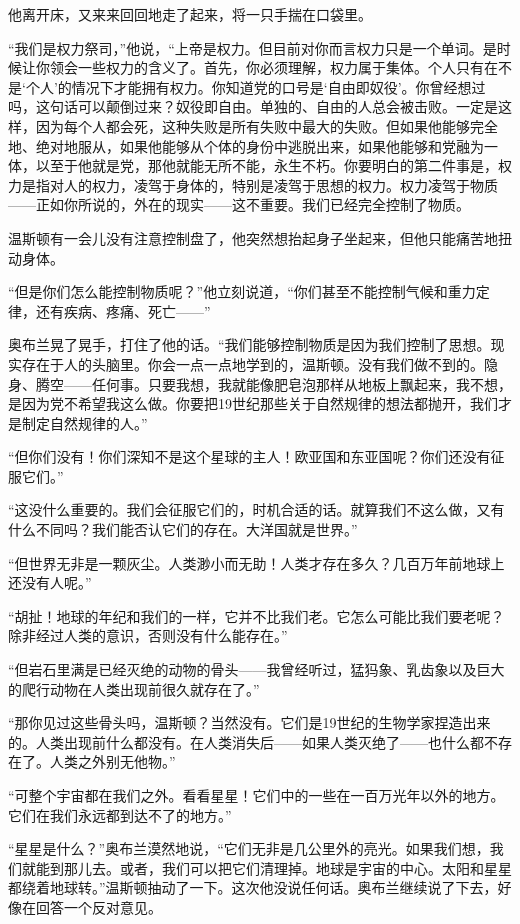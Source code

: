 他离开床，又来来回回地走了起来，将一只手揣在口袋里。

``我们是权力祭司，''他说，``上帝是权力。但目前对你而言权力只是一个单词。是时候让你领会一些权力的含义了。首先，你必须理解，权力属于集体。个人只有在不是`个人'的情况下才能拥有权力。你知道党的口号是`自由即奴役'。你曾经想过吗，这句话可以颠倒过来？奴役即自由。单独的、自由的人总会被击败。一定是这样，因为每个人都会死，这种失败是所有失败中最大的失败。但如果他能够完全地、绝对地服从，如果他能够从个体的身份中逃脱出来，如果他能够和党融为一体，以至于他就是党，那他就能无所不能，永生不朽。你要明白的第二件事是，权力是指对人的权力，凌驾于身体的，特别是凌驾于思想的权力。权力凌驾于物质------正如你所说的，外在的现实------这不重要。我们已经完全控制了物质。

温斯顿有一会儿没有注意控制盘了，他突然想抬起身子坐起来，但他只能痛苦地扭动身体。

``但是你们怎么能控制物质呢？''他立刻说道，``你们甚至不能控制气候和重力定律，还有疾病、疼痛、死亡------''

奥布兰晃了晃手，打住了他的话。``我们能够控制物质是因为我们控制了思想。现实存在于人的头脑里。你会一点一点地学到的，温斯顿。没有我们做不到的。隐身、腾空------任何事。只要我想，我就能像肥皂泡那样从地板上飘起来，我不想，是因为党不希望我这么做。你要把19世纪那些关于自然规律的想法都抛开，我们才是制定自然规律的人。''

``但你们没有！你们深知不是这个星球的主人！欧亚国和东亚国呢？你们还没有征服它们。''

``这没什么重要的。我们会征服它们的，时机合适的话。就算我们不这么做，又有什么不同吗？我们能否认它们的存在。大洋国就是世界。''

``但世界无非是一颗灰尘。人类渺小而无助！人类才存在多久？几百万年前地球上还没有人呢。''

``胡扯！地球的年纪和我们的一样，它并不比我们老。它怎么可能比我们要老呢？除非经过人类的意识，否则没有什么能存在。''

``但岩石里满是已经灭绝的动物的骨头------我曾经听过，猛犸象、乳齿象以及巨大的爬行动物在人类出现前很久就存在了。''

``那你见过这些骨头吗，温斯顿？当然没有。它们是19世纪的生物学家捏造出来的。人类出现前什么都没有。在人类消失后------如果人类灭绝了------也什么都不存在了。人类之外别无他物。''

``可整个宇宙都在我们之外。看看星星！它们中的一些在一百万光年以外的地方。它们在我们永远都到达不了的地方。''

``星星是什么？''奥布兰漠然地说，``它们无非是几公里外的亮光。如果我们想，我们就能到那儿去。或者，我们可以把它们清理掉。地球是宇宙的中心。太阳和星星都绕着地球转。''温斯顿抽动了一下。这次他没说任何话。奥布兰继续说了下去，好像在回答一个反对意见。

